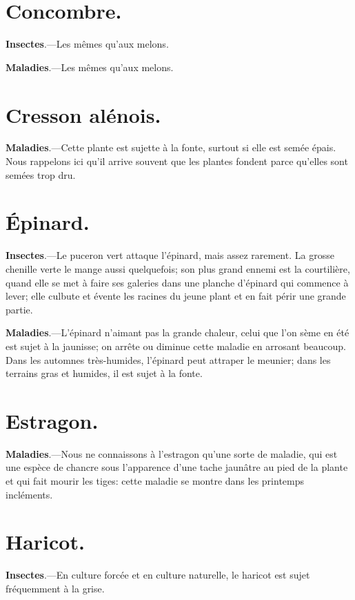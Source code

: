\documentclass[10pt,a4paper]{book}
\begin{document}
\section{Concombre.}

\textbf{Insectes}.---Les mêmes qu'aux melons.

\textbf{Maladies}.---Les mêmes qu'aux melons.

\section{Cresson alénois.}

\textbf{Maladies}.---Cette plante est sujette à la fonte, surtout si elle est semée épais. Nous rappelons ici qu'il arrive souvent que les plantes fondent parce qu'elles sont semées trop dru.

\section{Épinard.}

\textbf{Insectes}.---Le puceron vert attaque l'épinard, mais assez rarement. La grosse chenille verte le mange aussi quelquefois; son plus grand ennemi est la courtilière, quand elle se met à faire ses galeries dans une planche d'épinard qui commence à lever; elle culbute et évente les racines du jeune plant et en fait périr une grande partie.

\textbf{Maladies}.---L'épinard n'aimant pas la grande chaleur, celui que l'on sème en été est sujet à la jaunisse; on arrête ou diminue cette maladie en arrosant beaucoup. Dans les automnes très-humides, l'épinard peut attraper le meunier; dans les terrains gras et humides, il est sujet à la fonte.

\section{Estragon.}

\textbf{Maladies}.---Nous ne connaissons à l'estragon qu'une sorte de maladie, qui est une espèce de chancre sous l'apparence d'une tache jaunâtre au pied de la plante et qui fait mourir les tiges: cette maladie se montre dans les printemps incléments.

\section{Haricot.}

\textbf{Insectes}.---En culture forcée et en culture naturelle, le haricot est sujet fréquemment à la grise.
\end{document}
